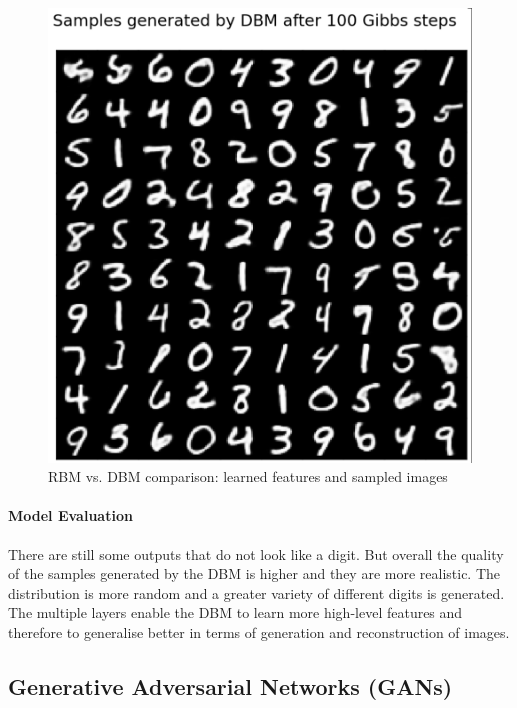 \begin{figure}[h!]
\begin{minipage}[t]{0.19\textwidth}
    \end{minipage}
    \hfill
    \begin{minipage}[t]{0.19\textwidth}
        \includegraphics[width=\textwidth]{figures/dbm-generation.png}
    \end{minipage}
    \caption{RBM vs. DBM comparison: learned features and sampled images}
    \label{fig:rbm-dbm-features-generation}
\end{figure}
\vspace{-10pt}

\paragraph{Model Evaluation}

There are still some outputs that do not look like a digit.
But overall the quality of the samples generated by the DBM is higher and they are more realistic.
The distribution is more random and a greater variety of different digits is generated.
The multiple layers enable the DBM to learn more high-level features and therefore to generalise better in terms of generation and reconstruction of images.

\newpage

\subsection{Generative Adversarial Networks (GANs)}

